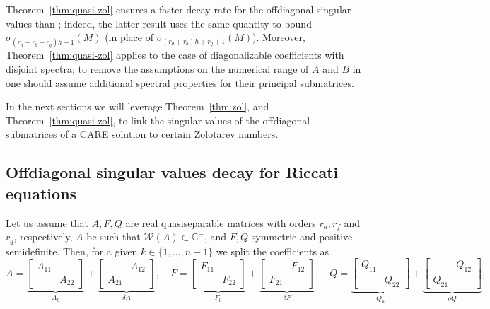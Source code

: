 \documentclass[a4paper,10pt]{article}
\begin{document}
Theorem~\ref{thm:quasi-zol} ensures a faster decay rate  for the offdiagonal singular values than \cite[Theorem 2.7]{massei18}; indeed, the latter result uses the same quantity to bound $\sigma_{(r_a+r_b+r_q)h+1}(M)$ (in place of $\sigma_{(r_a+r_b)h+r_q+1}(M)$). Moreover, Theorem~\ref{thm:quasi-zol} applies to the case of diagonalizable coefficients with disjoint spectra; to remove the assumptions on the numerical range of $A$ and $B$ in \cite[Theorem 2.7]{massei18} one should assume additional spectral properties for their principal submatrices.

In the next sections we will leverage Theorem~\ref{thm:zol}, and Theorem~\ref{thm:quasi-zol}, to link the singular values of the offdiagonal submatrices of a CARE solution to certain Zolotarev numbers.
\subsection{Offdiagonal singular values decay for Riccati equations}\label{sec:decay-care}
Let us assume that $A,F,Q$ are real quasiseparable matrices with orders $r_a, r_f$ and $r_q$, respectively,  $A$ be such that $\mathcal W(A)\subset\mathbb C^{-}$, and $F,Q$ symmetric and positive semidefinite. Then,  for a given $k\in\{1,\dots,n-1\}$ we split the coefficients as
$$
A=\underbrace{\left[\begin{smallmatrix}
		A_{11}\\ &A_{22}
\end{smallmatrix}\right]}_{A_0}+\underbrace{\left[\begin{smallmatrix}
		&A_{12}\\ A_{21}
\end{smallmatrix}\right]}_{\delta A}, \quad F=\underbrace{\left[\begin{smallmatrix}
		F_{11}\\ &F_{22}
\end{smallmatrix}\right]}_{F_0}+\underbrace{\left[\begin{smallmatrix}
		&F_{12}\\ F_{21}
\end{smallmatrix}\right]}_{\delta F},\quad Q=\underbrace{\left[\begin{smallmatrix}
		Q_{11}\\ &Q_{22}
\end{smallmatrix}\right]}_{Q_0}+\underbrace{\left[\begin{smallmatrix}
		&Q_{12}\\ Q_{21}
\end{smallmatrix}\right]}_{\delta Q},
$$
\end{document}
